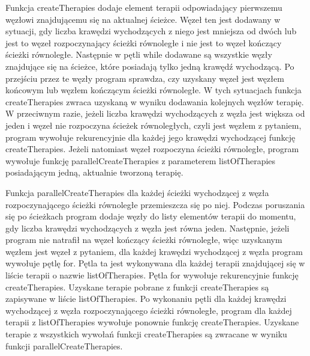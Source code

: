 Funkcja createTherapies dodaje element terapii odpowiadający pierwszemu węzłowi znajdującemu się na aktualnej ścieżce. Węzeł ten jest dodawany w sytuacji, gdy liczba krawędzi wychodzących z niego jest mniejsza od dwóch lub jest to węzeł rozpoczynający ścieżki równoległe i nie jest to węzeł kończący ścieżki równoległe. Następnie w pętli while dodawane są wszystkie węzły znajdujące się na ścieżce, które posiadają tylko jedną krawędź wychodzącą. Po przejściu przez te węzły program sprawdza, czy uzyskany węzeł jest węzłem końcowym lub węzłem kończącym ścieżki równoległe. W tych sytuacjach funkcja createTherapies zwraca uzyskaną w wyniku dodawania kolejnych węzłów terapię. W przeciwnym razie, jeżeli liczba krawędzi wychodzących z węzła jest większa od jeden i węzeł nie rozpoczyna ścieżek równoległych, czyli jest węzłem z pytaniem, program wywołuje rekurencyjnie dla każdej jego krawędzi wychodzącej funkcję createTherapies. Jeżeli natomiast węzeł rozpoczyna ścieżki równoległe, program wywołuje funkcję parallelCreateTherapies z parameterem listOfTherapies posiadającym jedną, aktualnie tworzoną terapię. 

Funkcja parallelCreateTherapies dla każdej ścieżki wychodzącej z węzła rozpoczynającego ścieżki równoległe przemieszcza się po niej. Podczas poruszania się po ścieżkach program dodaje węzły 
do listy elementów terapii do momentu, gdy liczba krawędzi wychodzących z węzła jest równa jeden. Następnie, jeżeli program nie natrafił na węzeł kończący ścieżki równoległe, więc uzyskanym węzłem jest węzeł z pytaniem, dla każdej krawędzi wychodzącej z węzła program wywołuje pętlę for. Pętla ta jest wykonywana dla każdej terapii znajdującej się w liście terapii o nazwie listOfTherapies. 
Pętla for wywołuje rekurencyjnie funkcję createTherapies. Uzyskane terapie pobrane z funkcji createTherapies są zapisywane w liście listOfTherapies. Po wykonaniu pętli dla każdej krawędzi wychodzącej z węzła rozpoczynającego ścieżki równoległe, program dla każdej terapii z listOfTherapies wywołuje ponownie funkcję createTherapies. Uzyskane terapie z wszystkich wywołań funkcji createTherapies są zwracane w wyniku funkcji parallelCreateTherapies.

